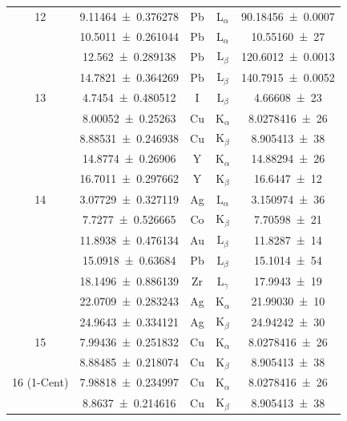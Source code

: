 \documentclass[
	a4paper,
	12pt,
	pagesize,
	ngerman
]{scrartcl}
\begin{document}
\begin{table}[H]
{\begin{tabular}{ c | c || c | c | c }
			12 
			& \SI{9.11464+-0.376278}{} &Pb &L$_\alpha$&  \SI{9 .18456(70)    }{} \\ 
			& \SI{10.5011+-0.261044}{} &Pb &L$_\alpha$&  \SI{10. 55160(27)     }{} \\
			& \SI{12.562+-0.289138}{} &Pb &L$_\beta$&  \SI{ 12 .6012(13)     }{} \\
			& \SI{14.7821+-0.364269}{} &Pb &L$_\beta$&  \SI{  14 .7915(52)    }{} \\
			\hline
			
			13 
			& \SI{4.7454+-0.480512}{} & I & $\text{L}_\beta$ & \SI{4,66608(23)}{} \\
			& \SI{8.00052+-0.25263}{} & Cu & $\text{K}_\alpha$ &  \SI{8,0278416(26)}{}\\
			& \SI{8.88531+-0.246938}{} & Cu &  $\text{K}_\beta$ & \SI{8,905413(38)}{}\\
			& \SI{14.8774+-0.26906}{} & Y & $\text{K}_\alpha$ & \SI{14,88294(26)}{} \\
			& \SI{16.7011+-0.297662}{} & Y & $\text{K}_\beta$ &  \SI{16,6447(12)}{} \\ 
			\hline
			
			14 
			& \SI{3.07729+-0.327119}{} &Ag &  $\text{L}_\alpha$ &  \SI{3,150974(36) }{} \\
			& \SI{7.7277+-0.526665}{} & Co & $\text{K}_\beta$ &  \SI{7,70598(21)}{} \\
			& \SI{11.8938+-0.476134}{} & Au & $\text{L}_\beta $ & \SI{11,8287(14) }{} \\
			& \SI{15.0918+-0.63684}{} & Pb & $\text{L}_\beta $ &  \SI{15,1014(54)}{} \\
			& \SI{18.1496+-0.886139}{} & Zr & $\text{L}_\gamma $ &  \SI{17,9943(19)}{} \\
			& \SI{22.0709+-0.283243}{} &Ag & $\text{K}_\alpha$ &  \SI{21,99030(10)}{} \\
			& \SI{24.9643+-0.334121}{} &Ag & $\text{K}_\beta$ &  \SI{24,94242(30)}{} \\ 
			\hline
			
			15 
			& \SI{7.99436+-0.251832}{} & Cu & $\text{K}_\alpha$ &  \SI{8,0278416(26)}{} \\
			& \SI{8.88485+-0.218074}{} &  Cu &  $\text{K}_\beta$ & \SI{8,905413(38)}{} \\ 
			\hline
			
			16 (1-Cent)
			& \SI{7.98818+-0.234997}{} & Cu & $\text{K}_\alpha$ &  \SI{8,0278416(26)}{} \\
			& \SI{8.8637+-0.214616}{} & Cu &  $\text{K}_\beta$ & \SI{8,905413(38)}{} \\ 
			\hline
			

\end{tabular}}
\end{table}
\end{document}
